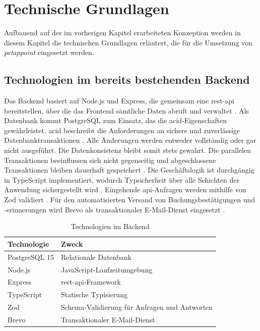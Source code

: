 \chapter{Technische Grundlagen}
\label{chap:grundlagen}

Aufbauend auf der im vorherigen Kapitel erarbeiteten Konzeption werden in diesem Kapitel die technischen Grundlagen erläutert, die für die Umsetzung von \textit{petappoint} eingesetzt werden.

\section{Technologien im bereits bestehenden Backend}

Das Backend basiert auf Node.js und Express, die gemeinsam eine \gls{rest}-\gls{api} bereitstellen, über die das Frontend sämtliche Daten abruft und verwaltet \cite{nodejs-docs, express-docs}. Als Datenbank kommt PostgreSQL zum Einsatz, das die \gls{acid}-Eigenschaften gewährleistet. \gls{acid} beschreibt die Anforderungen an sichere und zuverlässige Datenbanktransaktionen \cite{postgresql_transactions}. Alle Änderungen werden entweder vollständig oder gar nicht ausgeführt. Die Datenkonsistenz bleibt somit stets gewahrt. Die parallelen Transaktionen beeinflussen sich nicht gegenseitig und abgeschlossene Transaktionen bleiben dauerhaft gespeichert \cite{postgresql_about}. Die Geschäftslogik ist durchgängig in TypeScript implementiert, wodurch Typsicherheit über alle Schichten der Anwendung sichergestellt wird \cite{typescript-docs}. Eingehende \gls{api}-Anfragen werden mithilfe von Zod validiert \cite{zod-docs}. Für den automatisierten Versand von Buchungsbestätigungen und -erinnerungen wird Brevo als transaktionaler E-Mail-Dienst eingesetzt \cite{brevo-docs}.

\begin{table}[H]
\begin{tabular}{|p{5cm}|p{9cm}|}
\hline
\textbf{Technologie} & \textbf{Zweck} \\
\hline
PostgreSQL 15 & Relationale Datenbank \\
\hline
Node.js & JavaScript-Laufzeitumgebung \\
\hline
Express & \gls{rest}-\gls{api}-Framework \\
\hline
TypeScript & Statische Typisierung \\
\hline
Zod & Schema-Validierung für Anfragen und Antworten \\
\hline
Brevo & Transaktionaler E-Mail-Dienst \\
\hline
\end{tabular}
\caption{Technologien im Backend}
\end{table}

